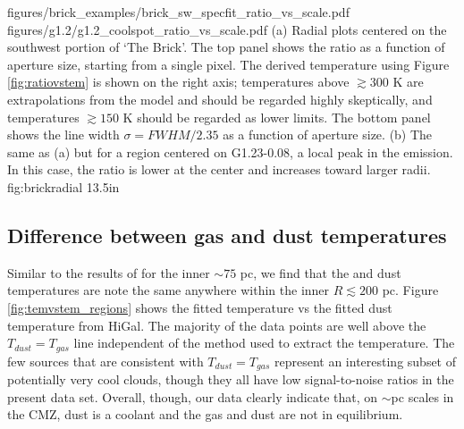 \FigureTwo
{figures/brick_examples/brick_sw_specfit_ratio_vs_scale.pdf}
{figures/g1.2/g1.2_coolspot_ratio_vs_scale.pdf}
{ (a) Radial plots centered on the southwest portion of `The Brick'.
The top panel shows the ratio \Rone as a function of aperture size, starting
from a single pixel.
The derived temperature using Figure \ref{fig:ratiovstem} is shown on the right
axis; temperatures above $\gtrsim300$ K are extrapolations from the model and
should be regarded highly skeptically, and temperatures $\gtrsim150$ K should
be regarded as lower limits.
The bottom panel shows the line width $\sigma = FWHM/2.35$
as a function of aperture size.  
(b) The same as (a) but for a region centered on G1.23-0.08, a local
peak in the \para \threeohthree emission.  In this case,
the ratio \Rone is lower at the center and increases toward larger radii.
}
{fig:brickradial}
{1}{3.5in}



\subsection{Difference between gas and dust temperatures}
Similar to the results of \citet{Ao2013a} for the inner $\sim75$ pc, we find
that the \para and dust temperatures are note the same anywhere within the
inner $R\lesssim200$ pc.  Figure \ref{fig:temvstem_regions} shows the fitted \para
temperature vs the fitted dust temperature from HiGal.  The majority of the
\formaldehyde data points are well above the $T_{dust}=T_{gas}$ line
independent of the method used to extract the temperature.  The few sources
that are consistent with $T_{dust}=T_{gas}$ represent an interesting subset
of potentially very cool clouds, though they all have low signal-to-noise
ratios in the present data set.  Overall, though, our data clearly indicate
that, on $\sim$pc scales in the CMZ, dust is a coolant and the gas and dust are
not in equilibrium.


